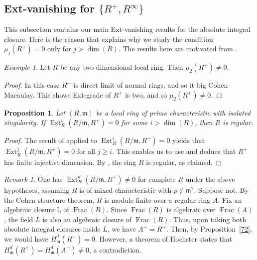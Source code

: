 \documentclass[11pt,a4paper]{amsart}
\numberwithin{equation}{section}
\newtheorem{proposition}[theorem]{Proposition}
\theoremstyle{definition}
\theoremstyle{remark}
\newtheorem{remark}[theorem]{Remark}
\newtheorem{example}[theorem]{Example}
\DeclareMathOperator{\Frac}{Frac}
\begin{document}
\subsection{Ext-vanishing for \(\{R^+,R^\infty\}\)}

This subsection contains our main Ext-vanishing results for the absolute integral closure.
Here is the reason that explains why we study the condition \(\mu_{j}(R^+)=0\) only for $j>\dim(R)$.
The results here are motivated from \cite{moh,moh5}.
\begin{example}
	Let $R$ be any two dimensional local ring. Then $\mu_2(R^+)\neq 0$.
\end{example}

\begin{proof}
In this case $R^+$ is direct limit of normal rings, and so it  big Cohen-Macaulay. This shows Ext-grade of $R^+$ is two, and so $\mu_2(R^+)\neq 0$.
\end{proof}


\begin{proposition}\label{811}
	Let \((R,\mathfrak{m})\) be a local ring of prime characteristic with isolated singularity. If
	\(
	\operatorname{Ext}_{R}^{i}(R/\mathfrak{m}, R^+) = 0
	\)
	for some \(i > \dim(R)\), then \(R\) is regular.
\end{proposition}

\begin{proof}
	The result of \cite[1.2]{IYENGAR} applied to \(\operatorname{Ext}_R^i(R/\mathfrak{m}, R^+) = 0\) yields that
	\(
	\operatorname{Ext}_R^j(R/\mathfrak{m}, R^+) = 0
	\)
	for all \(j \ge i\). This enables us to use \cite[Theorem VI.9]{sc3} and deduce that \(R^+\) has finite injective dimension. By \cite[Example 3.17(i)]{ryo}, the ring \(R\) is regular, as claimed.
\end{proof}
	
\begin{remark}
	One has \(\operatorname{Ext}_{R}^{d}(R/\mathfrak{m}, R^{+}) \neq 0\) for complete \(R\) under the above hypotheses, assuming \(R\) is of mixed characteristic with \(p \notin \mathfrak{m}^2\). Suppose not. By the Cohen structure theorem, \(R\) is module-finite over a regular ring \(A\). 
	Fix an algebraic closure L of $\Frac(R)$. Since $\Frac(R)$ is algebraic
	over $\Frac(A)$, the field $L$ is also an algebraic closure of
	$\Frac(R)$. Thus, upon taking both absolute integral closures inside $L$,
	we have
	\(
	A^+=R^+.
	\)
	 Then, by Proposition~\ref{72}, we would have \(H_{\mathfrak{m}}^{d}(R^+) = 0\). However, a theorem of Hochster \cite[Theorem 6.1(5)]{h} states that \(H_{\mathfrak{m}}^{d}(R^+) = H_{\mathfrak{m}}^{d}(A^+) \neq 0\), a contradiction.
\end{remark}
	
\end{document}
